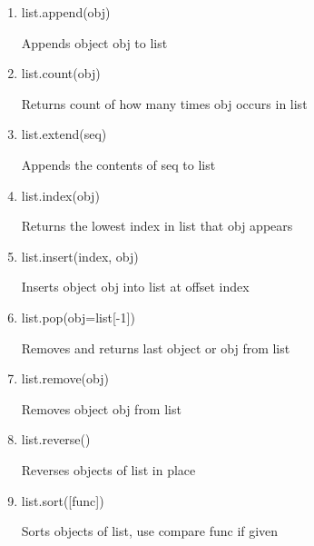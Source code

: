 \begin{enumerate}
\item \hspace*{0.5in} list.append(obj) \par
\vspace{12pt}
Appends object obj to list \par
\item \hspace*{0.5in} list.count(obj) \par
\vspace{12pt}
Returns count of how many times obj occurs in list \par
\item \hspace*{0.5in} list.extend(seq) \par
\vspace{12pt}
Appends the contents of seq to list \par
\item \hspace*{0.5in} list.index(obj) \par
\vspace{12pt}
Returns the lowest index in list that obj appears \par
\item \hspace*{0.5in} list.insert(index, obj) \par
\vspace{12pt}
Inserts object obj into list at offset index \par
\item \hspace*{0.5in} list.pop(obj=list[-1]) \par
\vspace{12pt}
Removes and returns last object or obj from list \par
\item \hspace*{0.5in} list.remove(obj) \par
\vspace{12pt}
Removes object obj from list \par
\item \hspace*{0.5in} list.reverse() \par
\vspace{12pt}
Reverses objects of list in place \par
\item \hspace*{0.5in} list.sort([func]) \par
\vspace{12pt}
Sorts objects of list, use compare func if given \par
\vspace{12pt}
\end{enumerate}
